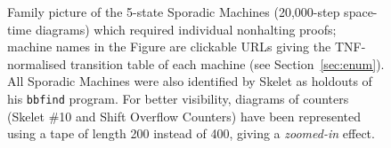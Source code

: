 \begin{figure}[h!]

    \caption{{\small Family picture of the 5-state Sporadic Machines (20,000-step space-time diagrams) which required individual \Coq nonhalting proofs; machine names in the Figure are clickable URLs giving the TNF-normalised transition table of each machine (see Section~\ref{sec:enum}). All Sporadic Machines were also identified by Skelet \cite{Skelet_bbfind} as holdouts of his \texttt{bbfind} program. For better visibility, diagrams of counters (Skelet \#10 and Shift Overflow Counters) have been represented using a tape of length 200 instead of 400, giving a \textit{zoomed-in} effect.}}
    \label{fig:sporadic}
\end{figure}


